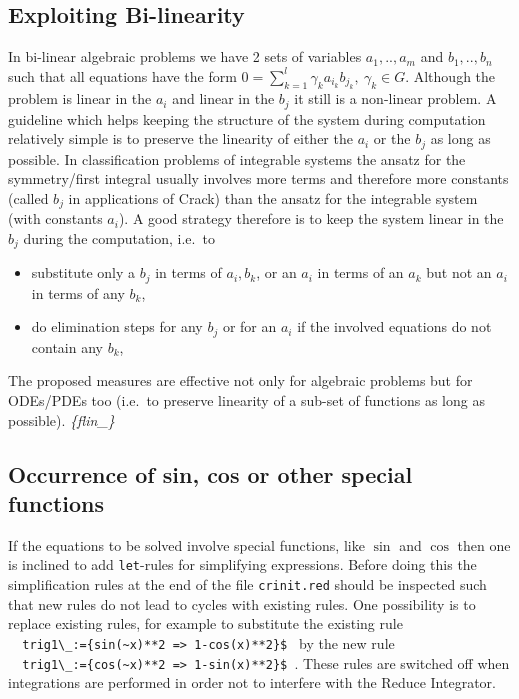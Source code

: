 \documentclass[12pt]{article}
\begin{document}
\subsection{Exploiting Bi-linearity}
  In bi-linear algebraic problems we have 2 sets of variables
  $a_1,..,a_m$ and $b_1,..,b_n$ such that all equations have
  the form $0=\sum_{k=1}^l \gamma_k a_{i_k}b_{j_k}, \ \gamma_k \in G$.  
  Although the
  problem is linear in the $a_i$ and linear in the $b_j$ it still is a
  non-linear problem. A guideline which helps keeping the structure of
  the system during computation relatively simple is to preserve the
  linearity of either the $a_i$ or the $b_j$ as long as possible. In
  classification problems of integrable systems
  the ansatz for the symmetry/first integral
  usually involves more terms and therefore more constants (called
  $b_j$ in applications of {\sc Crack}) than the ansatz for the
  integrable system (with constants $a_i$).  A good strategy therefore
  is to keep the system linear in the $b_j$ during the computation,
  i.e.\ to
  \begin{itemize}
  \item substitute only a $b_j$ in terms of $a_i, b_k$, or an $a_i$
    in terms of an $a_k$ but not an $a_i$ in terms of any $b_k$,
  \item do elimination steps for any $b_j$ or for an
    $a_i$ if the involved equations do not contain any $b_k$,
  \end{itemize}
  The proposed measures are effective not only for algebraic problems
  but for ODEs/PDEs too (i.e.\ to preserve linearity of a sub-set of
  functions as long as possible).
  {\em \{flin\_\} } 

\subsection{Occurrence of sin, cos or other special functions}

  If the equations to be solved involve special functions, like $\sin$
  and $\cos$ then one is inclined to add {\tt let}-rules for simplifying
  expressions. Before doing this the simplification rules at the end of
  the file {\tt crinit.red} should be inspected such that new rules do
  not lead to cycles with existing rules. One possibility is to replace
  existing rules, for example to substitute the existing rule \\
  \verb+  trig1\_:={sin(~x)**2 => 1-cos(x)**2}$ + by the new rule \\
  \verb+  trig1\_:={cos(~x)**2 => 1-sin(x)**2}$ +.
  These rules are switched off when integrations are performed in order
  not to interfere with the {\sc Reduce} Integrator.
\end{document}
